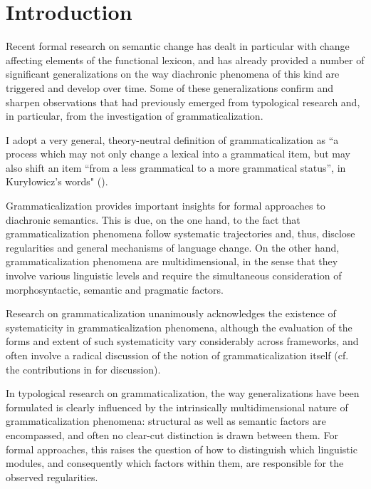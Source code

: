 \documentclass[output=paper]{langsci/langscibook}
\author{Chiara Gianollo\affiliation{Università di Bologna}}
\begin{document}
\maketitle
\section{Introduction}

Recent formal research on semantic change has dealt in particular with change affecting elements of the functional lexicon, and has already provided a number of significant generalizations on the way diachronic phenomena of this kind are triggered and develop over time. Some of these generalizations confirm and sharpen observations that had previously emerged from typological research and, in particular, from the investigation of grammaticalization.

I adopt a very general, theory-neutral definition of grammaticalization as ``a process which may not only change a lexical into a grammatical item, but may also shift an item ``from a less grammatical to a more grammatical status'', in Kury\l{}owicz's words" (\citealt[13]{Lehmann15}).

Grammaticalization provides important insights for formal approaches to diachronic semantics. This is due, on the one hand, to the fact that grammaticalization phenomena follow systematic trajectories and, thus, disclose regularities and general mechanisms of language change. On the other hand, grammaticalization phenomena are multidimensional, in the sense that they involve various linguistic levels and require the simultaneous consideration of morphosyntactic, semantic and pragmatic factors.

Research on grammaticalization unanimously acknowledges the existence of systematicity in grammaticalization phenomena, although the evaluation of the forms and extent of such systematicity vary considerably across frameworks, and often involve a radical discussion of the notion of grammaticalization itself (cf. the contributions in \citealt{Campbell01} for discussion).

In typological research on grammaticalization, the way generalizations have been formulated is clearly influenced by the intrinsically multidimensional nature of grammaticalization phenomena: structural as well as semantic factors are encompassed, and often no clear-cut distinction is drawn between them. For formal approaches, this raises the question of how to distinguish which linguistic modules, and consequently which factors within them, are responsible for the observed regularities.
\end{document}
